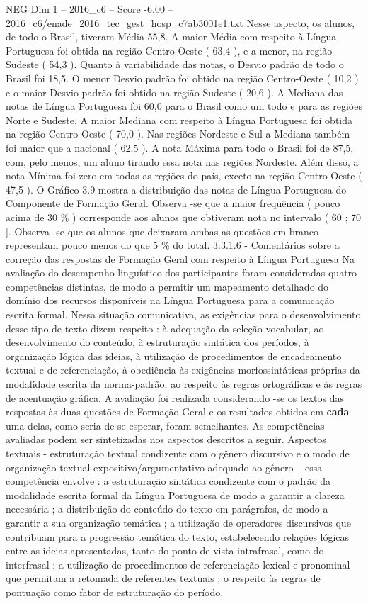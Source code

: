 \begin{textsample}{NEG Dim 1 – 2016\_c6 – Score -6.00 – 2016\_c6/enade\_2016\_tec\_gest\_hosp\_c7ab3001e1.txt}
Nesse aspecto, os alunos, de todo o Brasil, tiveram Média 55,8.
A maior Média com respeito à Língua Portuguesa foi obtida na região Centro-Oeste ( 63,4 ), e a menor, na região Sudeste ( 54,3 ).
Quanto à variabilidade das notas, o Desvio padrão de todo o Brasil foi 18,5.
O menor Desvio padrão foi obtido na região Centro-Oeste ( 10,2 ) e o maior Desvio padrão foi obtido na região Sudeste ( 20,6 ).
A Mediana das notas de Língua Portuguesa foi 60,0 para o Brasil como um todo e para as regiões Norte e Sudeste.
A maior Mediana com respeito à Língua Portuguesa foi obtida na região Centro-Oeste ( 70,0 ).
Nas regiões Nordeste e Sul a Mediana também foi maior que a nacional ( 62,5 ).
A nota Máxima para todo o Brasil foi de 87,5, com, pelo menos, um aluno tirando essa nota nas regiões Nordeste.
Além disso, a nota Mínima foi zero em todas as regiões do país, exceto na região Centro-Oeste ( 47,5 ).
O Gráfico 3.9 mostra a distribuição das notas de Língua Portuguesa do Componente de Formação Geral.
Observa -se que a maior frequência ( pouco acima de 30 \% ) corresponde aos alunos que obtiveram nota no intervalo ( 60 ; 70 ].
Observa -se que os alunos que deixaram ambas as questões em branco representam pouco menos do que 5 \% do total. 3.3.1.6 - Comentários sobre a correção das respostas de Formação Geral com respeito à Língua Portuguesa Na avaliação do desempenho linguístico dos participantes foram consideradas quatro competências distintas, de modo a permitir um mapeamento detalhado do domínio dos recursos disponíveis na Língua Portuguesa para a comunicação escrita formal.
Nessa situação comunicativa, as exigências para o desenvolvimento desse tipo de texto dizem respeito : à adequação da seleção vocabular, ao desenvolvimento do conteúdo, à estruturação sintática dos períodos, à organização lógica das ideias, à utilização de procedimentos de encadeamento textual e de referenciação, à obediência às exigências morfossintáticas próprias da modalidade escrita da norma-padrão, ao respeito às regras ortográficas e às regras de acentuação gráfica.
A avaliação foi realizada considerando -se os textos das respostas às duas questões de Formação Geral e os resultados obtidos em \textbf{cada} uma delas, como seria de se esperar, foram semelhantes.
As competências avaliadas podem ser sintetizadas nos aspectos descritos a seguir.
Aspectos textuais - estruturação textual condizente com o gênero discursivo e o modo de organização textual expositivo/argumentativo adequado ao gênero – essa competência envolve : a estruturação sintática condizente com o padrão da modalidade escrita formal da Língua Portuguesa de modo a garantir a clareza necessária ; a distribuição do conteúdo do texto em parágrafos, de modo a garantir a sua organização temática ; a utilização de operadores discursivos que contribuam para a progressão temática do texto, estabelecendo relações lógicas entre as ideias apresentadas, tanto do ponto de vista intrafrasal, como do interfrasal ; a utilização de procedimentos de referenciação lexical e pronominal que permitam a retomada de referentes textuais ; o respeito às regras de pontuação como fator de estruturação do período.

\end{textsample}
